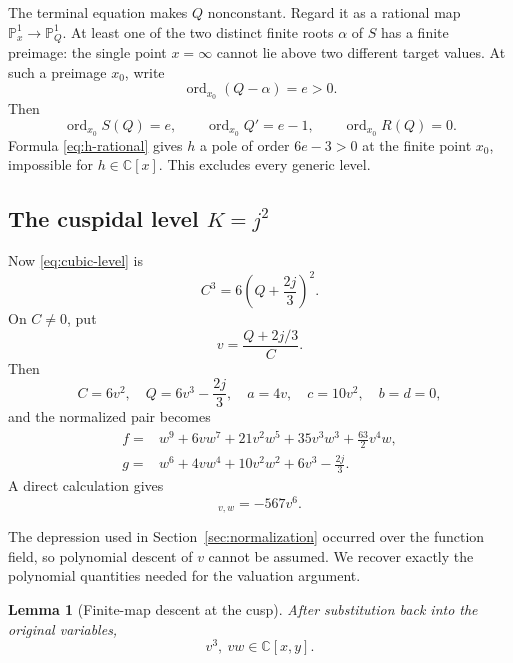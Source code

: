 \documentclass[11pt]{article}
\newtheorem{lemma}[theorem]{Lemma}
\theoremstyle{definition}
\theoremstyle{remark}
\newcommand{\C}{\mathbb C}
\newcommand{\ord}{\operatorname{ord}}
\begin{document}
The terminal equation makes \(Q\) nonconstant.  Regard it as a
rational map
\(\mathbb P^1_x\to\mathbb P^1_Q\).  At least one of the two distinct
finite roots \(\alpha\) of \(S\) has a finite preimage: the single point
\(x=\infty\) cannot lie above two different target values.  At such a
preimage \(x_0\), write
\[
 \ord_{x_0}(Q-\alpha)=e>0.
\]
Then
\[
 \ord_{x_0}S(Q)=e,\qquad
 \ord_{x_0}Q'=e-1,\qquad
 \ord_{x_0}R(Q)=0.
\]
Formula \eqref{eq:h-rational} gives \(h\) a pole of order
\(6e-3>0\) at the finite point \(x_0\), impossible for
\(h\in\C[x]\).  This excludes every generic level.

\subsection{The cuspidal level \(K=j^2\)}

Now \eqref{eq:cubic-level} is
\[
 C^3=6\left(Q+\frac{2j}{3}\right)^2.
\]
On \(C\neq0\), put
\[
 v=\frac{Q+2j/3}{C}.
\]
Then
\begin{equation}
 C=6v^2,\quad Q=6v^3-\frac{2j}{3},\quad
 a=4v,\quad c=10v^2,\quad b=d=0,
\label{eq:cusp-params}
\end{equation}
and the normalized pair becomes
\begin{align}
 f={}&w^9+6vw^7+21v^2w^5+35v^3w^3+\frac{63}{2}v^4w,
\label{eq:cusp-f}\\
 g={}&w^6+4vw^4+10v^2w^2+6v^3-\frac{2j}{3}.
\label{eq:cusp-g}
\end{align}
A direct calculation gives
\begin{equation}
 [f,g]_{v,w}=-567v^6.
\label{eq:cusp-jac}
\end{equation}

The depression used in Section~\ref{sec:normalization} occurred over
the function field, so polynomial descent of \(v\) cannot be assumed.
We recover exactly the polynomial quantities needed for the valuation
argument.

\begin{lemma}[Finite-map descent at the cusp]
\label{lem:finite}
After substitution back into the original variables,
\[
 v^3,\ vw\in\C[x,y].
\]
\end{lemma}
\end{document}
